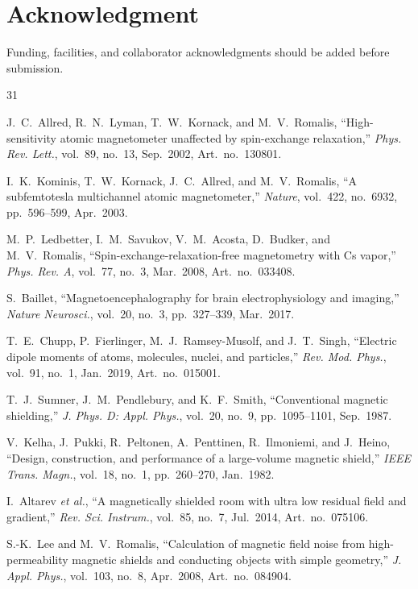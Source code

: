 \documentclass[letterpaper,journal]{IEEEtran}
\begin{document}
\section*{Acknowledgment}
Funding, facilities, and collaborator acknowledgments should be added before submission.

\begin{thebibliography}{31}

J.~C.~Allred, R.~N.~Lyman, T.~W.~Kornack, and M.~V.~Romalis,
``High-sensitivity atomic magnetometer unaffected by spin-exchange relaxation,''
\textit{Phys. Rev. Lett.}, vol.~89, no.~13, Sep.~2002, Art.~no.~130801.

I.~K.~Kominis, T.~W.~Kornack, J.~C.~Allred, and M.~V.~Romalis,
``A subfemtotesla multichannel atomic magnetometer,''
\textit{Nature}, vol.~422, no.~6932, pp.~596--599, Apr.~2003.

M.~P.~Ledbetter, I.~M.~Savukov, V.~M.~Acosta, D.~Budker, and M.~V.~Romalis,
``Spin-exchange-relaxation-free magnetometry with Cs vapor,''
\textit{Phys. Rev. A}, vol.~77, no.~3, Mar.~2008, Art.~no.~033408.

S.~Baillet,
``Magnetoencephalography for brain electrophysiology and imaging,''
\textit{Nature Neurosci.}, vol.~20, no.~3, pp.~327--339, Mar.~2017.

T.~E.~Chupp, P.~Fierlinger, M.~J.~Ramsey-Musolf, and J.~T.~Singh,
``Electric dipole moments of atoms, molecules, nuclei, and particles,''
\textit{Rev. Mod. Phys.}, vol.~91, no.~1, Jan.~2019, Art.~no.~015001.

T.~J.~Sumner, J.~M.~Pendlebury, and K.~F.~Smith,
``Conventional magnetic shielding,''
\textit{J. Phys. D: Appl. Phys.}, vol.~20, no.~9, pp.~1095--1101, Sep.~1987.

V.~Kelha, J.~Pukki, R.~Peltonen, A.~Penttinen, R.~Ilmoniemi, and J.~Heino,
``Design, construction, and performance of a large-volume magnetic shield,''
\textit{IEEE Trans. Magn.}, vol.~18, no.~1, pp.~260--270, Jan.~1982.

I.~Altarev \textit{et al.},
``A magnetically shielded room with ultra low residual field and gradient,''
\textit{Rev. Sci. Instrum.}, vol.~85, no.~7, Jul.~2014, Art.~no.~075106.

S.-K.~Lee and M.~V.~Romalis,
``Calculation of magnetic field noise from high-permeability magnetic shields and conducting objects with simple geometry,''
\textit{J. Appl. Phys.}, vol.~103, no.~8, Apr.~2008, Art.~no.~084904.


\end{thebibliography}
\end{document}
